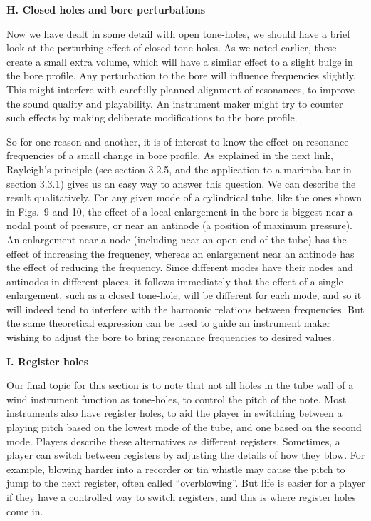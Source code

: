   \textbf{H. Closed holes and bore perturbations} 

  Now we have dealt in some detail with open tone-holes, we should have a brief 
  look at the perturbing effect of closed tone-holes. As we noted earlier, 
  these create a small extra volume, which will have a similar effect to a 
  slight bulge in the bore profile. Any perturbation to the bore will influence 
  frequencies slightly. This might interfere with carefully-planned alignment 
  of resonances, to improve the sound quality and playability. An instrument 
  maker might try to counter such effects by making deliberate modifications to 
  the bore profile. 

  So for one reason and another, it is of interest to know the effect on 
  resonance frequencies of a small change in bore profile. As explained in the 
  next link, Rayleigh’s principle (see section 3.2.5, and the application to a 
  marimba bar in section 3.3.1) gives us an easy way to answer this question. 
  We can describe the result qualitatively. For any given mode of a cylindrical 
  tube, like the ones shown in Figs.\ 9 and 10, the effect of a local 
  enlargement in the bore is biggest near a nodal point of pressure, or near an 
  antinode (a position of maximum pressure). An enlargement near a node 
  (including near an open end of the tube) has the effect of increasing the 
  frequency, whereas an enlargement near an antinode has the effect of reducing 
  the frequency. Since different modes have their nodes and antinodes in 
  different places, it follows immediately that the effect of a single 
  enlargement, such as a closed tone-hole, will be different for each mode, and 
  so it will indeed tend to interfere with the harmonic relations between 
  frequencies. But the same theoretical expression can be used to guide an 
  instrument maker wishing to adjust the bore to bring resonance frequencies to 
  desired values. 

  \textbf{I. Register holes} 

  Our final topic for this section is to note that not all holes in the tube 
  wall of a wind instrument function as tone-holes, to control the pitch of the 
  note. Most instruments also have register holes, to aid the player in 
  switching between a playing pitch based on the lowest mode of the tube, and 
  one based on the second mode. Players describe these alternatives as 
  different registers. Sometimes, a player can switch between registers by 
  adjusting the details of how they blow. For example, blowing harder into a 
  recorder or tin whistle may cause the pitch to jump to the next register, 
  often called “overblowing”. But life is easier for a player if they have a 
  controlled way to switch registers, and this is where register holes come in. 


